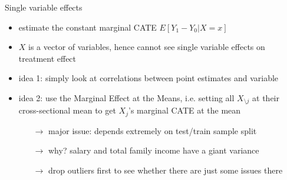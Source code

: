 \documentclass[a4paper, 12pt]{beamer}
\begin{document}
\begin{frame}{Single variable effects}
  \begin{itemize}
    \item estimate the constant marginal CATE $E[Y_1 - Y_0|X=x]$ 
    \item $X$ is a vector of variables, hence cannot see single variable effects on treatment effect 
    \item idea 1: simply look at correlations between point estimates and variable 
    \item idea 2: use the Marginal Effect at the Means, i.e. setting all $X_{\setminus j}$ at their cross-sectional mean to get $X_j$'s marginal CATE at the mean 
    \begin{itemize}
      \item[$\rightarrow$] major issue: depends extremely on test/train sample split 
      \item[$\rightarrow$] why? salary and total family income have a giant variance
      \item[$\rightarrow$] drop outliers first to see whether there are just some issues there
    \end{itemize}
  \end{itemize}
\end{frame}
\end{document}
